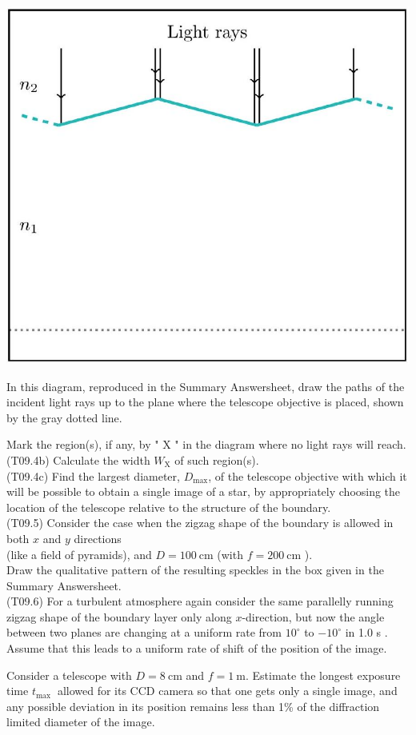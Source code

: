\documentclass[10pt]{article}
\begin{document}
    \includegraphics[max width=\textwidth, center]{2025_08_23_e94579452776a99c4850g-11}
    
    In this diagram, reproduced in the Summary Answersheet, draw the paths of the incident light rays up to the plane where the telescope objective is placed, shown by the gray dotted line.
    
    Mark the region(s), if any, by " X " in the diagram where no light rays will reach.\\
    (T09.4b) Calculate the width $W_{\mathrm{X}}$ of such region(s).\\
    (T09.4c) Find the largest diameter, $D_{\max }$, of the telescope objective with which it will be possible to obtain a single image of a star, by appropriately choosing the location of the telescope relative to the structure of the boundary.\\
    (T09.5) Consider the case when the zigzag shape of the boundary is allowed in both $x$ and $y$ directions\\
    (like a field of pyramids), and $D=100 \mathrm{~cm}$ (with $f=200 \mathrm{~cm}$ ).\\
    Draw the qualitative pattern of the resulting speckles in the box given in the Summary Answersheet.\\
    (T09.6) For a turbulent atmosphere again consider the same parallelly running zigzag shape of the boundary layer only along $x$-direction, but now the angle between two planes are changing at a uniform rate from $10^{\circ}$ to $-10^{\circ}$ in 1.0 s . Assume that this leads to a uniform rate of shift of the position of the image.
    
    Consider a telescope with $D=8 \mathrm{~cm}$ and $f=1 \mathrm{~m}$. Estimate the longest exposure time $t_{\text {max }}$ allowed for its CCD camera so that one gets only a single image, and any possible deviation in its position remains less than 1\% of the diffraction limited diameter of the image.\\
\end{document}
